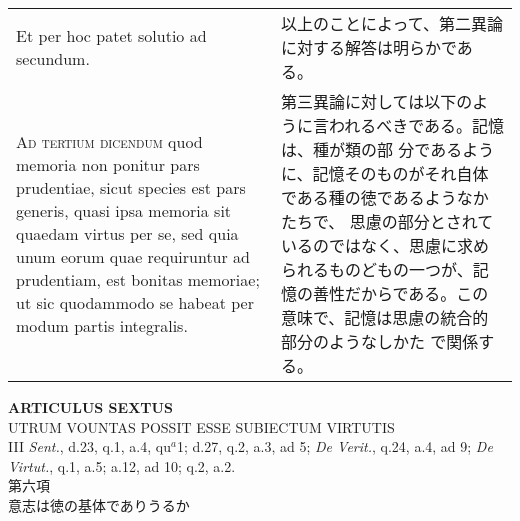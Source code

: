 \documentclass[10pt]{jsarticle}
\begin{document}
\begin{longtable}{p{21em}p{21em}}
\\



Et per hoc patet solutio ad secundum.

&

以上のことによって、第二異論に対する解答は明らかである。
 
\\



{\scshape Ad tertium dicendum} quod memoria non ponitur pars
prudentiae, sicut species est pars generis, quasi ipsa memoria sit
quaedam virtus per se, sed quia unum eorum quae requiruntur ad
prudentiam, est bonitas memoriae; ut sic quodammodo se habeat per
modum partis integralis.

&

 第三異論に対しては以下のように言われるべきである。記憶は、種が類の部
分であるように、記憶そのものがそれ自体である種の徳であるようなかたちで、
思慮の部分とされているのではなく、思慮に求められるものどもの一つが、記
憶の善性だからである。この意味で、記憶は思慮の統合的部分のようなしかた
で関係する。
 

\end{longtable}
\newpage


\begin{center}
{\Large {\bf ARTICULUS SEXTUS}}\\
{\large UTRUM VOUNTAS POSSIT ESSE SUBIECTUM VIRTUTIS}\\
{\footnotesize III {\itshape Sent.}, d.23, q.1, a.4, qu$^{a}$1; d.27, q.2, a.3, ad 5; {\itshape De Verit.}, q.24, a.4, ad 9; {\itshape De Virtut.}, q.1, a.5; a.12, ad 10; q.2, a.2.}\\
{\Large 第六項\\意志は徳の基体でありうるか}
\end{center}
\end{document}
